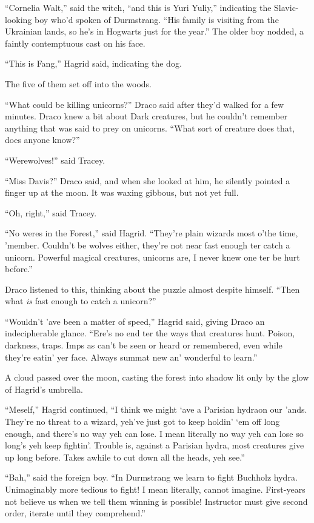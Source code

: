 ``Cornelia Walt,'' said the witch, ``and this is Yuri Yuliy,'' indicating the Slavic-looking boy who'd spoken of Durmstrang. ``His family is visiting from the Ukrainian lands, so he's in Hogwarts just for the year.'' The older boy nodded, a faintly contemptuous cast on his face.

``This is Fang,'' Hagrid said, indicating the dog.

The five of them set off into the woods.

``What could be killing unicorns?'' Draco said after they'd walked for a few minutes. Draco knew a bit about Dark creatures, but he couldn't remember anything that was said to prey on unicorns. ``What sort of creature does that, does anyone know?''

``Werewolves!'' said Tracey.

``Miss Davis?'' Draco said, and when she looked at him, he silently pointed a finger up at the moon. It was waxing gibbous, but not yet full.

``Oh, right,'' said Tracey.

``No weres in the Forest,'' said Hagrid. ``They're plain wizards most o'the time, 'member. Couldn't be wolves either, they're not near fast enough ter catch a unicorn. Powerful magical creatures, unicorns are, I never knew one ter be hurt before.''

Draco listened to this, thinking about the puzzle almost despite himself. ``Then what \emph{is} fast enough to catch a unicorn?''

``Wouldn't 'ave been a matter of speed,'' Hagrid said, giving Draco an indecipherable glance. ``Ere's no end ter the ways that creatures hunt. Poison, darkness, traps. Imps as can't be seen or heard or remembered, even while they're eatin' yer face. Always summat new an' wonderful to learn.''

A cloud passed over the moon, casting the forest into shadow lit only by the glow of Hagrid's umbrella.

``Meself,'' Hagrid continued, ``I think we might `ave a Parisian hydraon our 'ands. They're no threat to a wizard, yeh've just got to keep holdin' `em off long enough, and there's no way yeh can lose. I mean literally no way yeh can lose so long's yeh keep fightin'. Trouble is, against a Parisian hydra, most creatures give up long before. Takes awhile to cut down all the heads, yeh see.''

``Bah,'' said the foreign boy. ``In Durmstrang we learn to fight Buchholz hydra. Unimaginably more tedious to fight! I mean literally, cannot imagine. First-years not believe us when we tell them winning is possible! Instructor must give second order, iterate until they comprehend.''

